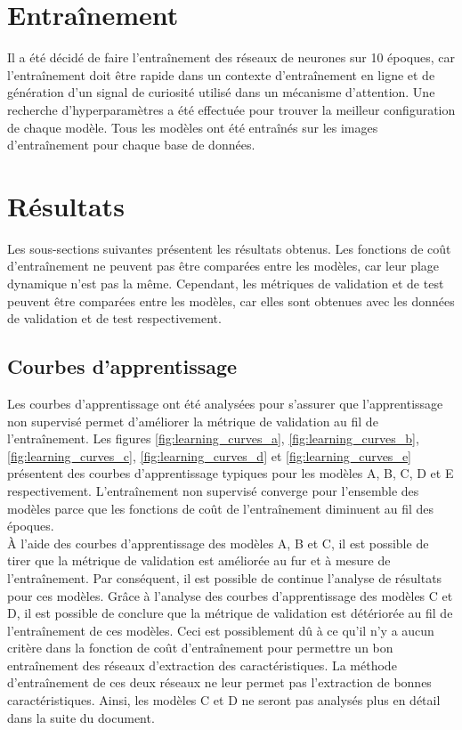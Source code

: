 \section{Entraînement}
    Il a été décidé de faire l'entraînement des réseaux de neurones sur 10 époques, car l'entraînement doit être rapide dans un contexte d'entraînement en ligne et de génération d'un signal de curiosité utilisé dans un mécanisme d'attention. Une recherche d'hyperparamètres a été effectuée pour trouver la meilleur configuration de chaque modèle. Tous les modèles ont été entraînés sur les images d'entraînement pour chaque base de données.
    
\section{Résultats}
    Les sous-sections suivantes présentent les résultats obtenus. Les fonctions de coût d'entraînement ne peuvent pas être comparées entre les modèles, car leur plage dynamique n'est pas la même. Cependant, les métriques de validation et de test peuvent être comparées entre les modèles, car elles sont obtenues avec les données de validation et de test respectivement.

\subsection{Courbes d'apprentissage}
    Les courbes d'apprentissage ont été analysées pour s'assurer que l'apprentissage non supervisé permet d'améliorer la métrique de validation au fil de l'entraînement. Les figures \ref{fig:learning_curves_a}, \ref{fig:learning_curves_b}, \ref{fig:learning_curves_c}, \ref{fig:learning_curves_d} et \ref{fig:learning_curves_e} présentent des courbes d'apprentissage typiques pour les modèles A, B, C, D et E respectivement. L'entraînement non supervisé converge pour l'ensemble des modèles parce que les fonctions de coût de l'entraînement diminuent au fil des époques.\\

    À l'aide des courbes d'apprentissage des modèles A, B et C, il est possible de tirer que la métrique de validation est améliorée au fur et à mesure de l'entraînement. Par conséquent, il est possible de continue l'analyse de résultats pour ces modèles. Grâce à l'analyse des courbes d'apprentissage des modèles C et D, il est possible de conclure que la métrique de validation est détériorée au fil de  l'entraînement de ces modèles. Ceci est possiblement dû à ce qu'il n'y a aucun critère dans la fonction de coût d'entraînement pour permettre un bon entraînement des réseaux d'extraction des caractéristiques. La méthode d'entraînement de ces deux réseaux ne leur permet pas l'extraction de bonnes caractéristiques. Ainsi, les modèles C et D ne seront pas analysés plus en détail dans la suite du document.

